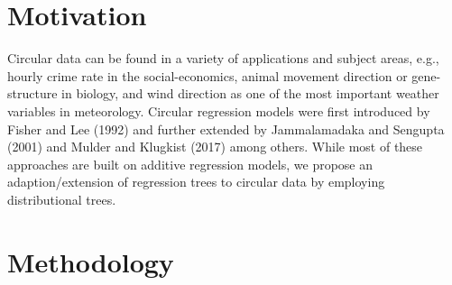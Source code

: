 \documentclass[twoside]{report}
\begin{document}


\section{Motivation}

Circular data can be found in a variety of applications and subject areas, 
e.g., hourly crime rate in the social-economics, 
animal movement direction or gene-structure in biology, 
and wind direction as one of the most important weather variables in meteorology.
Circular regression models were first introduced by Fisher and Lee (1992) and 
further extended by Jammalamadaka and Sengupta (2001) and 
Mulder and Klugkist (2017) among others.
While most of these approaches are built on additive regression models, 
we propose an adaption/extension of regression trees to circular data by employing 
distributional trees.


\section{Methodology}
\end{document}
